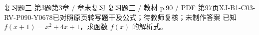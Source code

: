 \par\noindent\begin{minipage}{\linewidth}
\begin{bankitem}{复习题三 第3题}{第3章 / 章末复习 复习题三 / 教材 p.90 / PDF 第97页}{XJ-B1-C03-RV-P090-Y0678}{已对照原页转写题干及公式；待教师复核；未制作答案}
已知 $f(x+1)=x^2+4x+1$，求函数 $f(x)$ 的解析式。
\end{bankitem}
\end{minipage}\par\medskip

